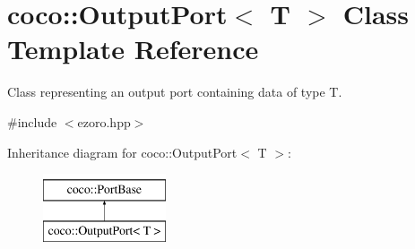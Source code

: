 \hypertarget{classcoco_1_1_output_port}{\section{coco\-:\-:Output\-Port$<$ T $>$ Class Template Reference}
\label{classcoco_1_1_output_port}
}


Class representing an output port containing data of type T.  




{\ttfamily \#include $<$ezoro.\-hpp$>$}

Inheritance diagram for coco\-:\-:Output\-Port$<$ T $>$\-:\begin{figure}[H]
\begin{center}
\leavevmode
\includegraphics[height=2.000000cm]{classcoco_1_1_output_port}
\end{center}
\end{figure}
